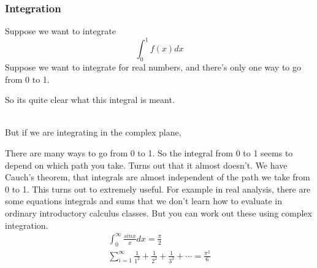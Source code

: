 \documentclass{article}
\begin{document}
\subsubsection{Integration}
Suppose we want to integrate
\begin{displaymath}
	\int_{0}^{1}f(x)dx
\end{displaymath}
Suppose we want to integrate for real numbers, and there's only one way to go from 0 to 1.
\begin{center}
\end{center}
So its quite clear what this integral is meant.

\noindent \\ But if we are integrating in the complex plane,
\begin{center}
\end{center}
There are many ways to go from 0 to 1. So the integral from 0 to 1 seems to depend on which path you take.
Turns out that it almost doesn't. We have Cauch's theorem, that integrals are almost independent of the path
we take from 0 to 1. This turns out to extremely useful. For example in real analysis, there are some equations integrals and sums that we don't learn how to evaluate in ordinary
introductory calculus classes. But you can work out these using complex integration.
\begin{gather*}
	\int_{0}^{\infty}\frac{sinx}{x}dx = \frac{\pi}{2} \\
	\displaystyle\sum_{i=1}^{\infty} \frac{1}{1^2} + \frac{1}{2^2} + \frac{1}{3^2} + \cdots = \frac{\pi^2}{6}
\end{gather*}
\end{document}
